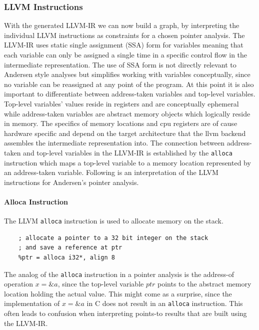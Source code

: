 \subsubsection{LLVM Instructions}
With the generated LLVM-IR we can now build a graph, by interpreting the individual LLVM instructions as constraints for a chosen pointer analysis.
The LLVM-IR uses static single assignment (SSA) form for variables meaning that each variable can only be assigned a single time in a specific control flow in the intermediate representation.
The use of SSA form is not directly relevant to Andersen style analyses but simplifies working with variables conceptually, since no variable can be reassigned at any point of the program.
At this point it is also important to differentiate between address-taken variables and top-level variables.
Top-level variables' values reside in registers and are conceptually ephemeral while address-taken variables are abstract memory objects which logically reside in memory. The specifics of memory locations and cpu registers are of cause hardware specific and depend on the target architecture that the llvm backend assembles the intermediate representation into.
The connection between address-taken and top-level variables in the LLVM-IR is established by the \verb|alloca| instruction which maps a top-level variable to a memory location represented by an address-taken variable.
Following is an interpretation of the LLVM instructions for Andersen's pointer analysis.

\paragraph{Alloca Instruction}
The LLVM \verb|alloca| instruction is used to allocate memory on the stack.
\begin{verbatim}
    ; allocate a pointer to a 32 bit integer on the stack 
    ; and save a reference at ptr
    %ptr = alloca i32*, align 8
\end{verbatim}
The analog of the \verb|alloca| instruction in a pointer analysis is the address-of operation $x = \&a$, since the top-level variable $ptr$ points to the abstract memory location holding the actual value.
This might come as a surprise, since the implementation of $x = \&a$ in C does not result in an \verb|alloca| instruction. This often leads to confusion when interpreting points-to results that are built using the LLVM-IR.

